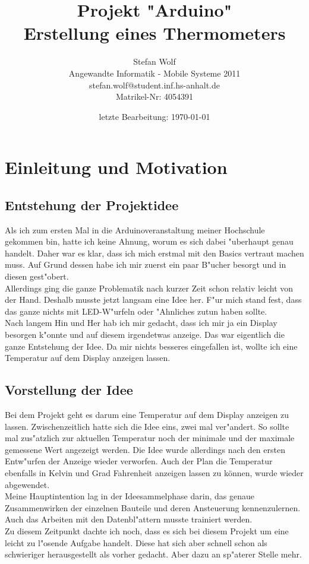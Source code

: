 \documentclass[a4paper]{scrreprt}
\author
{
	Stefan Wolf \\ 
	Angewandte Informatik - Mobile Systeme 2011 \\ 
	stefan.wolf@student.inf.hs-anhalt.de \\ 
	Matrikel-Nr: 4054391
}
\date{letzte Bearbeitung: \today}
\title
{
	Projekt "Arduino" \\ 
	\vspace{5 mm}
	{
		\large Erstellung eines Thermometers \\
	}
}
\begin{document}
	\maketitle			%
		
	\tableofcontents	%
	\setcounter{tocdepth}{3}	%
	\chapter{Einleitung und Motivation}	
		\section{Entstehung der Projektidee}
			Als ich zum ersten Mal in die Arduinoveranstaltung meiner Hochschule gekommen bin, 
			hatte ich keine Ahnung,	worum es sich dabei "uberhaupt genau handelt.
			Daher war es klar, dass ich mich erstmal mit den Basics vertraut machen muss.
			Auf Grund dessen habe ich mir zuerst ein paar B"ucher besorgt 
			und in diesen gest"obert. \\
			Allerdings ging die ganze Problematik nach kurzer Zeit schon relativ leicht von der Hand.   
			Deshalb musste jetzt langsam eine Idee her. F"ur mich stand fest, 
			dass das ganze nichts mit LED-W"urfeln oder "Ahnliches zutun haben sollte. \\
			Nach langem Hin und Her hab ich mir gedacht, dass ich mir ja ein Display 
			besorgen k"onnte und auf diesem irgendetwas anzeige.
			Das war eigentlich die ganze Entstehung der Idee. Da mir nichts besseres eingefallen
			ist, wollte ich eine Temperatur auf dem Display anzeigen lassen.
			
		\section{Vorstellung der Idee}	
			Bei dem Projekt geht es darum eine Temperatur auf dem Display anzeigen zu lassen.
			Zwischenzeitlich hatte sich die Idee eins, zwei mal ver"andert. So sollte mal 
			zus"atzlich	zur aktuellen Temperatur noch der minimale und der maximale 
			gemessene Wert angezeigt werden. Die Idee wurde allerdings nach den ersten
			Entw"urfen der Anzeige wieder verworfen. Auch der Plan die Temperatur 
			ebenfalls in Kelvin und Grad Fahrenheit anzeigen lassen zu können, 
			wurde wieder abgewendet.\\
			\newline
			Meine Hauptintention lag in der Ideesammelphase darin, das genaue 
			Zusammenwirken der einzelnen Bauteile und deren Ansteuerung 
			kennenzulernen. Auch das Arbeiten mit den Datenbl"attern
			musste trainiert werden. \\
			Zu diesem Zeitpunkt dachte ich noch, dass es sich bei diesem Projekt
			um eine leicht zu l"osende Aufgabe handelt. Diese hat sich aber schnell schon
			als schwieriger herausgestellt als vorher gedacht. Aber dazu an sp"aterer Stelle mehr.   
			
\end{document}
